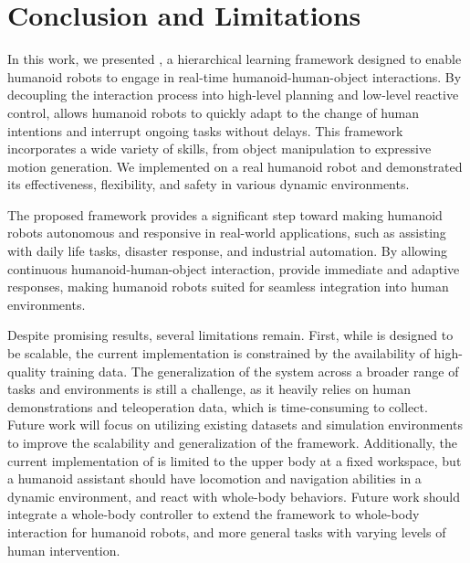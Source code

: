 \section{Conclusion and Limitations}

In this work, we presented \our, a hierarchical learning framework designed to enable humanoid robots to engage in real-time humanoid-human-object interactions. By decoupling the interaction process into high-level planning and low-level reactive control, \our allows humanoid robots to quickly adapt to the change of human intentions and interrupt ongoing tasks without delays. This framework incorporates a wide variety of skills, from object manipulation to expressive motion generation. We implemented \our on a real humanoid robot and demonstrated its effectiveness, flexibility, and safety in various dynamic environments.

The proposed framework provides a significant step toward making humanoid robots autonomous and responsive in real-world applications, such as assisting with daily life tasks, disaster response, and industrial automation. By allowing continuous humanoid-human-object interaction, \our provide immediate and adaptive responses, making humanoid robots suited for seamless integration into human environments.

Despite promising results, several limitations remain. First, while \our is designed to be scalable, the current implementation is constrained by the availability of high-quality training data. The generalization of the system across a broader range of tasks and environments is still a challenge, as it heavily relies on human demonstrations and teleoperation data, which is time-consuming to collect. Future work will focus on utilizing existing datasets and simulation environments to improve the scalability and generalization of the framework.
Additionally, the current implementation of \our is limited to the upper body at a fixed workspace, but a humanoid assistant should have locomotion and navigation abilities in a dynamic environment, and react with whole-body behaviors. Future work should integrate a whole-body controller to extend the framework to whole-body interaction for humanoid robots, and more general tasks with varying levels of human intervention.